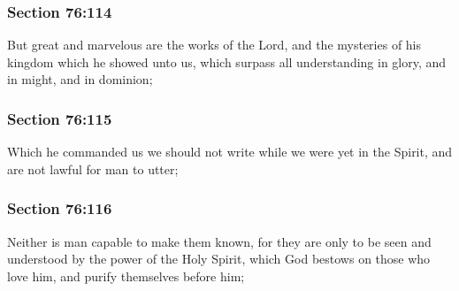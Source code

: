 	\subsubsection{Section 76:114} %
		\label{DC76-114}

		But great and marvelous are the works of the Lord, and the mysteries of his kingdom which he showed unto us, which surpass all understanding in glory, and in might, and in dominion;


	\subsubsection{Section 76:115} %
		\label{DC76-115}

		Which he commanded us we should not write while we were yet in the Spirit, and are not lawful for man to utter;


	\subsubsection{Section 76:116} %
		\label{DC76-116}

		Neither is man capable to make them known, for they are only to be seen and understood by the power of the Holy Spirit, which God bestows on those who love him, and purify themselves before him;


